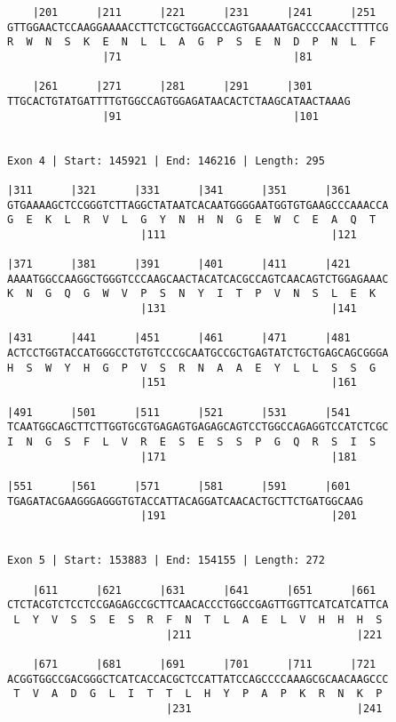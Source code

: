 \documentclass{article}
\begin{document}
\begin{Verbatim}
    |201      |211      |221      |231      |241      |251  
GTTGGAACTCCAAGGAAAACCTTCTCGCTGGACCCAGTGAAAATGACCCCAACCTTTTCG
R  W  N  S  K  E  N  L  L  A  G  P  S  E  N  D  P  N  L  F  
               |71                           |81            
  
    |261      |271      |281      |291      |301      
TTGCACTGTATGATTTTGTGGCCAGTGGAGATAACACTCTAAGCATAACTAAAG
               |91                           |101     
  
 
Exon 4 | Start: 145921 | End: 146216 | Length: 295
 
|311      |321      |331      |341      |351      |361      
GTGAAAAGCTCCGGGTCTTAGGCTATAATCACAATGGGGAATGGTGTGAAGCCCAAACCA
G  E  K  L  R  V  L  G  Y  N  H  N  G  E  W  C  E  A  Q  T  
                     |111                          |121     
  
|371      |381      |391      |401      |411      |421      
AAAATGGCCAAGGCTGGGTCCCAAGCAACTACATCACGCCAGTCAACAGTCTGGAGAAAC
K  N  G  Q  G  W  V  P  S  N  Y  I  T  P  V  N  S  L  E  K  
                     |131                          |141     
  
|431      |441      |451      |461      |471      |481      
ACTCCTGGTACCATGGGCCTGTGTCCCGCAATGCCGCTGAGTATCTGCTGAGCAGCGGGA
H  S  W  Y  H  G  P  V  S  R  N  A  A  E  Y  L  L  S  S  G  
                     |151                          |161     
  
|491      |501      |511      |521      |531      |541      
TCAATGGCAGCTTCTTGGTGCGTGAGAGTGAGAGCAGTCCTGGCCAGAGGTCCATCTCGC
I  N  G  S  F  L  V  R  E  S  E  S  S  P  G  Q  R  S  I  S  
                     |171                          |181     
  
|551      |561      |571      |581      |591      |601  
TGAGATACGAAGGGAGGGTGTACCATTACAGGATCAACACTGCTTCTGATGGCAAG
                     |191                          |201 
  
 
Exon 5 | Start: 153883 | End: 154155 | Length: 272
 
    |611      |621      |631      |641      |651      |661  
CTCTACGTCTCCTCCGAGAGCCGCTTCAACACCCTGGCCGAGTTGGTTCATCATCATTCA
 L  Y  V  S  S  E  S  R  F  N  T  L  A  E  L  V  H  H  H  S 
                         |211                          |221 
  
    |671      |681      |691      |701      |711      |721  
ACGGTGGCCGACGGGCTCATCACCACGCTCCATTATCCAGCCCCAAAGCGCAACAAGCCC
 T  V  A  D  G  L  I  T  T  L  H  Y  P  A  P  K  R  N  K  P 
                         |231                          |241 
  

\end{Verbatim}
\end{document}
